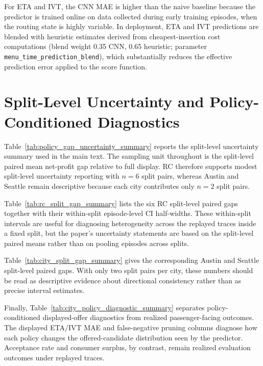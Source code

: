 For ETA and IVT, the CNN MAE is higher than the naive baseline because the predictor is trained online on data collected during early training episodes, when the routing state is highly variable. In deployment, ETA and IVT predictions are blended with heuristic estimates derived from cheapest-insertion cost computations (blend weight 0.35 CNN, 0.65 heuristic; parameter \texttt{menu\_time\_prediction\_blend}), which substantially reduces the effective prediction error applied to the score function.

\section{Split-Level Uncertainty and Policy-Conditioned Diagnostics}
\label{app:split_uncertainty}

Table~\ref{tab:policy_gap_uncertainty_summary} reports the split-level uncertainty summary used in the main text. The sampling unit throughout is the split-level paired mean net-profit gap relative to full display. RC therefore supports modest split-level uncertainty reporting with $n=6$ split pairs, whereas Austin and Seattle remain descriptive because each city contributes only $n=2$ split pairs.

Table~\ref{tab:rc_split_gap_summary} lists the six RC split-level paired gaps together with their within-split episode-level CI half-widths. These within-split intervals are useful for diagnosing heterogeneity across the replayed traces inside a fixed split, but the paper's uncertainty statements are based on the split-level paired means rather than on pooling episodes across splits.


Table~\ref{tab:city_split_gap_summary} gives the corresponding Austin and Seattle split-level paired gaps. With only two split pairs per city, these numbers should be read as descriptive evidence about directional consistency rather than as precise interval estimates.


Finally, Table~\ref{tab:city_policy_diagnostic_summary} separates policy-conditioned displayed-offer diagnostics from realized passenger-facing outcomes. The displayed ETA/IVT MAE and false-negative pruning columns diagnose how each policy changes the offered-candidate distribution seen by the predictor. Acceptance rate and consumer surplus, by contrast, remain realized evaluation outcomes under replayed traces.

